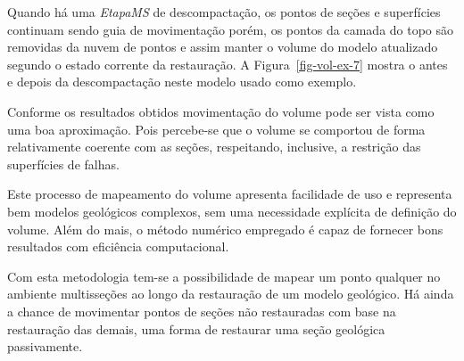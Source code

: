 Quando há uma \emph{EtapaMS} de descompactação, os pontos de seções e superfícies continuam sendo guia de movimentação porém, os pontos da camada do topo são removidas da nuvem de pontos e assim manter o volume do modelo atualizado segundo o estado corrente da restauração. A Figura~\ref{fig-vol-ex-7} mostra o antes e depois da descompactação neste modelo usado como exemplo.

Conforme os resultados obtidos movimentação do volume pode ser vista como uma boa aproximação. Pois percebe-se que o volume se comportou de forma relativamente coerente com as seções, respeitando, inclusive, a restrição das superfícies de falhas.

Este processo de mapeamento do volume apresenta facilidade de uso e representa bem modelos geológicos complexos, sem uma necessidade explícita de definição do volume. Além do mais, o método numérico empregado é capaz de fornecer bons resultados com eficiência computacional.

Com esta metodologia tem-se a possibilidade de mapear um ponto qualquer no ambiente multisseções ao longo da restauração de um modelo geológico. Há ainda a chance de movimentar pontos de seções não restauradas com base na restauração das demais, uma forma de restaurar uma seção geológica passivamente.
